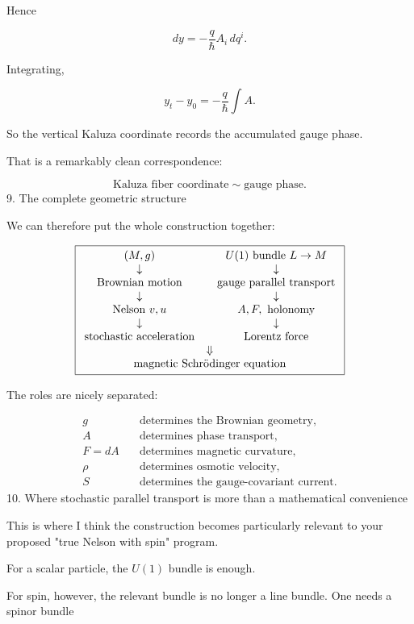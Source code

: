 Hence

$$ dy = -\frac{q}{\hbar}A_i\,dq^i. $$

Integrating,

$$ y_t-y_0 = -\frac{q}{\hbar}\int A. $$

So the vertical Kaluza coordinate records the accumulated gauge phase.

That is a remarkably clean correspondence:

$$ \boxed{ \text{Kaluza fiber coordinate} \sim \text{gauge phase}. } $$
9. The complete geometric structure

We can therefore put the whole construction together:

$$ \boxed{ \begin{array}{ccc} (M,g) & & U(1)\text{ bundle }L\to M \\ \downarrow && \downarrow \\ \text{Brownian motion} && \text{gauge parallel transport} \\ \downarrow && \downarrow \\ \text{Nelson }v,u && A,F,\text{ holonomy} \\ \downarrow && \downarrow \\ \text{stochastic acceleration} && \text{Lorentz force} \\ \multicolumn{3}{c}{ \Downarrow }\\ \multicolumn{3}{c}{ \text{magnetic Schrödinger equation} } \end{array} } $$

The roles are nicely separated:

$$ \boxed{ \begin{aligned} g &\quad\text{determines the Brownian geometry},\\ A &\quad\text{determines phase transport},\\ F=dA &\quad\text{determines magnetic curvature},\\ \rho &\quad\text{determines osmotic velocity},\\ S &\quad\text{determines the gauge-covariant current}. \end{aligned}} $$
10. Where stochastic parallel transport is more than a mathematical convenience

This is where I think the construction becomes particularly relevant to your proposed "true Nelson with spin" program.

For a scalar particle, the \(U(1)\) bundle is enough.

For spin, however, the relevant bundle is no longer a line bundle. One needs a spinor bundle


